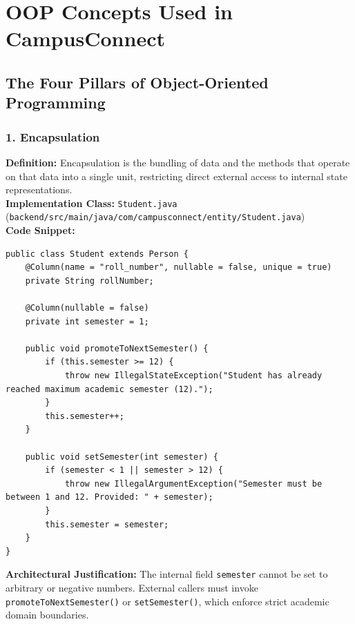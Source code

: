 \documentclass[12pt,a4paper,oneside]{report}
\begin{document}
\chapter{OOP Concepts Used in CampusConnect}

\section{The Four Pillars of Object-Oriented Programming}

\subsection{1. Encapsulation}
\textbf{Definition:} Encapsulation is the bundling of data and the methods that operate on that data into a single unit, restricting direct external access to internal state representations.\\[0.2cm]
\textbf{Implementation Class:} \texttt{Student.java} (\texttt{backend/src/main/java/com/campusconnect/entity/Student.java})\\[0.2cm]
\textbf{Code Snippet:}
\begin{lstlisting}
public class Student extends Person {
    @Column(name = "roll_number", nullable = false, unique = true)
    private String rollNumber;

    @Column(nullable = false)
    private int semester = 1;

    public void promoteToNextSemester() {
        if (this.semester >= 12) {
            throw new IllegalStateException("Student has already reached maximum academic semester (12).");
        }
        this.semester++;
    }

    public void setSemester(int semester) {
        if (semester < 1 || semester > 12) {
            throw new IllegalArgumentException("Semester must be between 1 and 12. Provided: " + semester);
        }
        this.semester = semester;
    }
}
\end{lstlisting}
\textbf{Architectural Justification:} The internal field \texttt{semester} cannot be set to arbitrary or negative numbers. External callers must invoke \texttt{promoteToNextSemester()} or \texttt{setSemester()}, which enforce strict academic domain boundaries.
\end{document}

